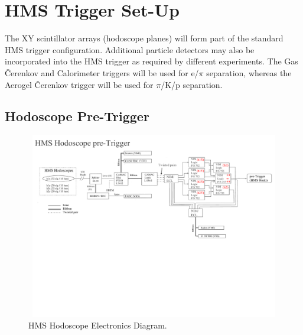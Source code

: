\documentclass[11pt]{article}
\begin{document}
\section{HMS Trigger Set-Up} 
\indent The XY scintillator arrays (hodoscope planes) will form part of the standard HMS trigger configuration.  
Additional particle detectors may also be incorporated into the HMS trigger as required by different experiments. The Gas \v{C}erenkov and Calorimeter triggers will be
used for e/$\pi$ separation, whereas the Aerogel \v{C}erenkov trigger will be used for $\pi$/K/p separation. 


\subsection{Hodoscope Pre-Trigger}

\begin{figure}[h!]
  \centering
  \includegraphics[width=7.0in, height=3.2in]{HMS_HODO_TRIGGER.pdf}
  \caption{HMS Hodoscope Electronics Diagram.}
  \label{fig:hms_hod_trg}
\end{figure}
\end{document}
